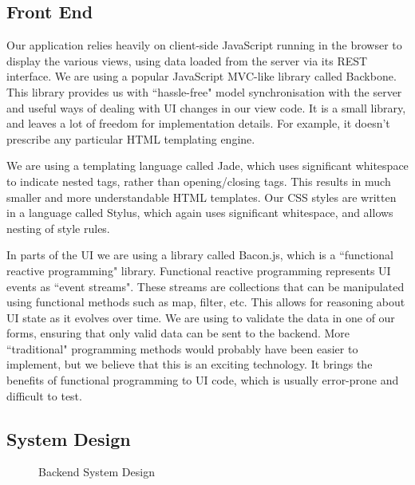 \documentclass[11pt]{article}
\begin{document}
\subsection {Front End}

Our application relies heavily on client-side JavaScript running in the browser to display the various views, using data loaded from the server via its REST interface.
We are using a popular JavaScript MVC-like library called Backbone. This library provides us with ``hassle-free" model synchronisation with the server and useful ways of dealing with UI changes in our view code. It is a small library, and leaves a lot of freedom for implementation details. For example, it doesn't prescribe any particular HTML templating engine.

We are using a templating language called Jade, which uses significant whitespace to indicate nested tags, rather than opening/closing tags. This results in much smaller and more understandable HTML templates. Our CSS styles are written in a language called Stylus, which again uses significant whitespace, and allows nesting of style rules.

In parts of the UI we are using a library called Bacon.js, which is a ``functional reactive programming" library. Functional reactive programming represents UI events as ``event streams". These streams are collections that can be manipulated using functional methods such as map, filter, etc. This allows for reasoning about UI state as it evolves over time. We are using to validate the data in one of our forms, ensuring that only valid data can be sent to the backend. More ``traditional" programming methods would probably have been easier to implement, but we believe that this is an exciting technology. It brings the benefits of functional programming to UI code, which is usually error-prone and difficult to test.

\subsection {System Design}

\begin{figure}[H]
\centering
{}
\caption{\label{fig:backend-diagram} Backend System Design}
\end{figure}
\end{document}

